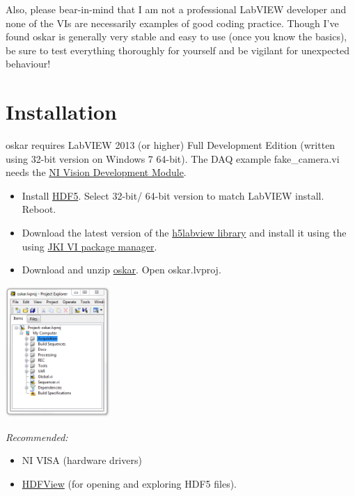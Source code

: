 \documentclass[10pt,a4paper]{article}
\begin{document}
Also, please bear-in-mind that I am not a professional LabVIEW developer and none of the VIs are necessarily examples of good coding practice. Though I've found oskar is generally very stable and easy to use (once you know the basics), be sure to test everything thoroughly for yourself and be vigilant for unexpected behaviour!
\section{Installation}
oskar requires LabVIEW 2013 (or higher) Full Development Edition (written using 32-bit version
on Windows 7 64-bit). The DAQ example fake\_camera.vi needs the \href{http://www.ni.com/downloads/}{NI Vision Development Module}.

\begin{itemize}

\item  Install \href{https://www.hdfgroup.org/HDF5/release/obtain5.html}{HDF5}. Select 32-bit/ 64-bit version to match LabVIEW install. Reboot.

\item Download the latest version of the \href{https://sourceforge.net/projects/h5labview/files/}{h5labview library} and install it using the using  \href{http://vipm.jki.net/}{JKI VI package manager}. 

\item Download and unzip \href{https://github.com/PositroniumSpectroscopy/oskar}{oskar}. Open oskar.lvproj.

\end{itemize}

\includegraphics[width=0.3\textwidth]{images/oskar.png}

\emph{Recommended:}
\begin{itemize}
	\item NI VISA (hardware drivers)
	\item  \href{https://www.hdfgroup.org/products/java/hdfview/}{HDFView} (for opening and exploring HDF5 files).
\end{itemize}
\end{document}
